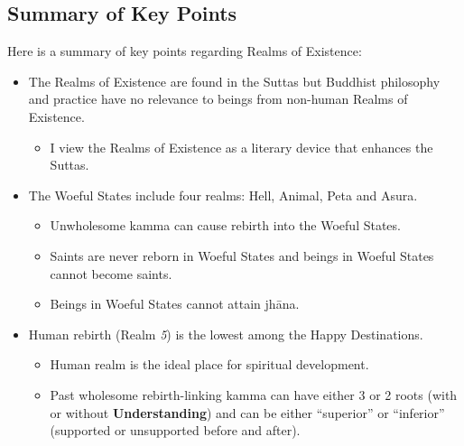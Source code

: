 \subsection*{Summary of Key Points}

Here is a summary of key points regarding Realms of Existence:

\begin{itemize}

\item The Realms of Existence are found in the Suttas but Buddhist philosophy and practice have no relevance to beings from non-human Realms of Existence.

\begin{itemize}

\item I view the Realms of Existence as a literary device that enhances the Suttas.

\end{itemize}

\item The Woeful States include four realms: Hell, Animal, Peta and Asura.

\begin{itemize}

\item Unwholesome kamma can cause rebirth into the Woeful States.

\item Saints are never reborn in Woeful States and beings in Woeful States cannot become saints.

\item Beings in Woeful States cannot attain jhāna.

\end{itemize}

\item Human rebirth (Realm \textit{5}) is the lowest among the Happy Destinations.

\begin{itemize}

\item Human realm is the ideal place for spiritual development.

\item Past wholesome rebirth-linking kamma can have either 3 or 2 roots (with or without \textbf{Understanding}) and can be either “superior” or “inferior” (supported or unsupported before and after).

\begin{itemize}


\end{itemize}
\end{itemize}
\end{itemize}
